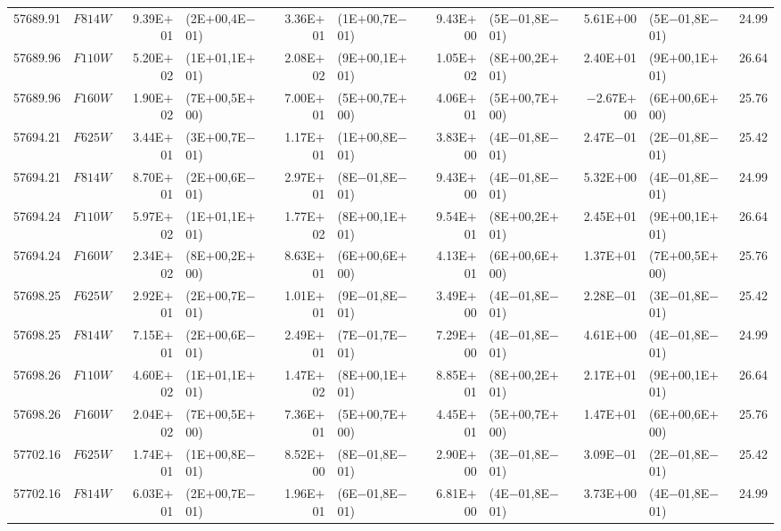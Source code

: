 \begin{tabular}{r c r @{\hspace{0.5em}} l r @{\hspace{0.5em}} l r @{\hspace{0.5em}} l r @{\hspace{0.5em}} l r}
57689.91 & $F814W$ & 9.39E$+$01 & (2E$+$00,4E$-$01) & 3.36E$+$01 & (1E$+$00,7E$-$01) & 9.43E$+$00 & (5E$-$01,8E$-$01) & 5.61E$+$00 & (5E$-$01,8E$-$01) & 24.99\\
57689.96 & $F110W$ & 5.20E$+$02 & (1E$+$01,1E$+$01) & 2.08E$+$02 & (9E$+$00,1E$+$01) & 1.05E$+$02 & (8E$+$00,2E$+$01) & 2.40E$+$01 & (9E$+$00,1E$+$01) & 26.64\\
57689.96 & $F160W$ & 1.90E$+$02 & (7E$+$00,5E$+$00) & 7.00E$+$01 & (5E$+$00,7E$+$00) & 4.06E$+$01 & (5E$+$00,7E$+$00) & $-$2.67E$+$00 & (6E$+$00,6E$+$00) & 25.76\\
57694.21 & $F625W$ & 3.44E$+$01 & (3E$+$00,7E$-$01) & 1.17E$+$01 & (1E$+$00,8E$-$01) & 3.83E$+$00 & (4E$-$01,8E$-$01) & 2.47E$-$01 & (2E$-$01,8E$-$01) & 25.42\\
57694.21 & $F814W$ & 8.70E$+$01 & (2E$+$00,6E$-$01) & 2.97E$+$01 & (8E$-$01,8E$-$01) & 9.43E$+$00 & (4E$-$01,8E$-$01) & 5.32E$+$00 & (4E$-$01,8E$-$01) & 24.99\\
57694.24 & $F110W$ & 5.97E$+$02 & (1E$+$01,1E$+$01) & 1.77E$+$02 & (8E$+$00,1E$+$01) & 9.54E$+$01 & (8E$+$00,2E$+$01) & 2.45E$+$01 & (9E$+$00,1E$+$01) & 26.64\\
57694.24 & $F160W$ & 2.34E$+$02 & (8E$+$00,2E$+$00) & 8.63E$+$01 & (6E$+$00,6E$+$00) & 4.13E$+$01 & (6E$+$00,6E$+$00) & 1.37E$+$01 & (7E$+$00,5E$+$00) & 25.76\\
57698.25 & $F625W$ & 2.92E$+$01 & (2E$+$00,7E$-$01) & 1.01E$+$01 & (9E$-$01,8E$-$01) & 3.49E$+$00 & (4E$-$01,8E$-$01) & 2.28E$-$01 & (3E$-$01,8E$-$01) & 25.42\\
57698.25 & $F814W$ & 7.15E$+$01 & (2E$+$00,6E$-$01) & 2.49E$+$01 & (7E$-$01,7E$-$01) & 7.29E$+$00 & (4E$-$01,8E$-$01) & 4.61E$+$00 & (4E$-$01,8E$-$01) & 24.99\\
57698.26 & $F110W$ & 4.60E$+$02 & (1E$+$01,1E$+$01) & 1.47E$+$02 & (8E$+$00,1E$+$01) & 8.85E$+$01 & (8E$+$00,2E$+$01) & 2.17E$+$01 & (9E$+$00,1E$+$01) & 26.64\\
57698.26 & $F160W$ & 2.04E$+$02 & (7E$+$00,5E$+$00) & 7.36E$+$01 & (5E$+$00,7E$+$00) & 4.45E$+$01 & (5E$+$00,7E$+$00) & 1.47E$+$01 & (6E$+$00,6E$+$00) & 25.76\\
57702.16 & $F625W$ & 1.74E$+$01 & (1E$+$00,8E$-$01) & 8.52E$+$00 & (8E$-$01,8E$-$01) & 2.90E$+$00 & (3E$-$01,8E$-$01) & 3.09E$-$01 & (2E$-$01,8E$-$01) & 25.42\\
57702.16 & $F814W$ & 6.03E$+$01 & (2E$+$00,7E$-$01) & 1.96E$+$01 & (6E$-$01,8E$-$01) & 6.81E$+$00 & (4E$-$01,8E$-$01) & 3.73E$+$00 & (4E$-$01,8E$-$01) & 24.99\\

\end{tabular}
